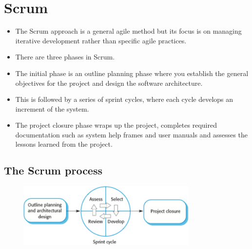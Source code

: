 \section{ Scrum}
\begin{itemize}

\item The Scrum approach is a general agile method but its focus is on managing iterative development rather than specific agile practices.

\item There are three phases in Scrum.

\item The initial phase is an outline planning phase where you establish the general objectives for the project and design the software architecture.
\item This is followed by a series of sprint cycles, where each cycle develops an increment of the system.
\item The project closure phase wraps up the project, completes required documentation such as system help frames and user manuals and assesses the lessons learned from the project.


\end{itemize}
\subsection{ The Scrum process}
\begin{figure}[h!]
    \centering
    \includegraphics[width = 0.8\textwidth]{./figures/L2_7.png}
    \caption{}
    \label{fig:L2_7}
\end{figure}

